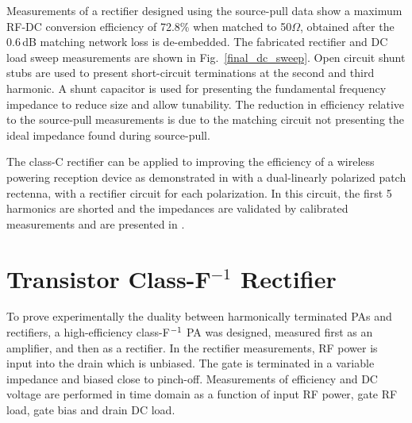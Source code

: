 

Measurements of a rectifier designed using the source-pull data show a maximum RF-DC conversion efficiency of 72.8\% when matched to 50$\Omega$, obtained after the 0.6\,dB matching network loss is de-embedded.  The fabricated rectifier and DC load sweep measurements are shown in Fig.~\ref{final_dc_sweep}. Open circuit shunt stubs are used to present short-circuit terminations at the second and third harmonic.  A shunt capacitor is used for presenting the fundamental frequency impedance to reduce size and allow tunability.  The reduction in efficiency relative to the source-pull measurements is due to the matching circuit not presenting the ideal impedance found during source-pull.





The class-C rectifier can be applied to improving the efficiency of a wireless powering reception device as demonstrated in \cite{robergIMS2012} with a dual-linearly polarized patch rectenna, with a rectifier circuit for each polarization. In this circuit, the first 5 harmonics are shorted and the impedances are validated by calibrated measurements and are presented in \cite{robergIMS2012}.















\section{Transistor Class-F$^{-1}$ Rectifier}

To prove experimentally the duality between harmonically terminated PAs and rectifiers, a high-efficiency class-F$^{\rm -1}$ PA was designed, measured first as an amplifier, and then as a rectifier. In the rectifier measurements, RF power is input into the drain which is unbiased. The gate is terminated in a variable impedance and biased close to pinch-off. Measurements of efficiency and DC voltage are performed in time domain as a function of input RF power, gate RF load, gate bias and drain DC load. 

